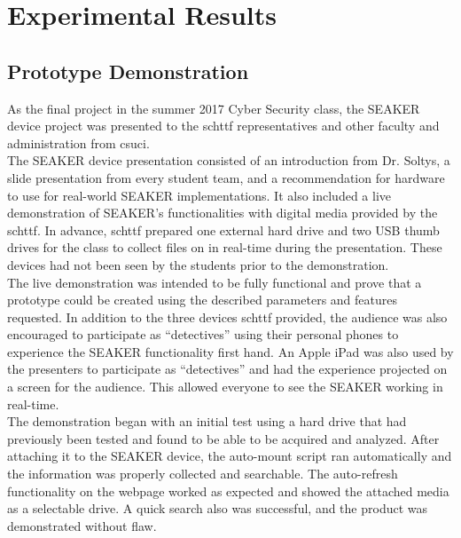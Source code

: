 \documentclass[12pt]{article}
\begin{document}
\section{Experimental Results}
\label{sect-experimentalResults}

\subsection{Prototype Demonstration}

As the final project in the summer 2017 Cyber Security class, the SEAKER device
project was presented to the \gls{schttf} representatives and other faculty and
administration from \gls{csuci}.\\

The SEAKER device presentation consisted of an introduction from Dr. Soltys, a 
slide presentation from every student team, and a recommendation for hardware to 
use for real-world SEAKER implementations.  It also included a live demonstration
of SEAKER's functionalities with digital media provided by the \gls{schttf}.
In advance, \gls{schttf} prepared one external hard drive and two USB thumb drives
for the class to collect files on in real-time during the presentation.  These
devices had not been seen by the students prior to the demonstration.\\

The live demonstration was intended to be fully
functional and prove that a prototype could be created using the described
parameters and features requested.  In addition to the three devices \gls{schttf}
provided, the audience was also encouraged to participate
as ``detectives'' using their personal phones to experience the SEAKER functionality
first hand.  An Apple iPad was also used by the presenters to participate as
``detectives'' and had the experience projected on a screen for the audience.
This allowed everyone to see the SEAKER working in real-time.\\

The demonstration began with an initial test using a hard drive that had previously
been tested and found to be able to be acquired and analyzed.  After attaching it
to the SEAKER device, the auto-mount script ran automatically and the information
was properly collected and searchable.  The auto-refresh functionality on the
webpage worked as expected and showed the attached media as a selectable drive.
A quick search also was successful, and the product was demonstrated without flaw.\\
\end{document}
